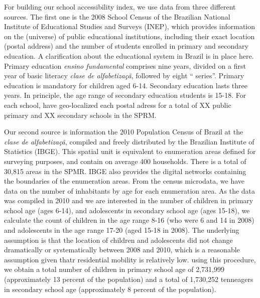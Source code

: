 \documentclass[]{article}
\begin{document}
For building our school accessibility index, we use data from three
different sources. The first one is the 2008 School Census of the
Brazilian National Institute of Educational Studies and Surveys (INEP),
which provides information on the (universe) of public educational
institutions, including their exact location (postal address) and the
number of students enrolled in primary and secondary education. A
clarification about the educational system in Brazil is in place here.
Primary education \textit{ensino fundamental} comprises nine years,
divided on a first year of basic literacy
\textit{clase de alfabetiza\c{c}\~{a}}, followed by eight `` series''.
Primary education is mandatory for children aged 6-14. Secondary
education lasts three years. In principle, the age range of secondary
education students is 15-18. For each school, have geo-localized each
postal adress for a total of XX public primary and XX secondary schools
in the SPRM.

Our second source is information the 2010 Population Census of Brazil at
the \textit{clase de alfabetiza\c{c}\~{a}}, compiled and freely
distributed by the Brazilian Institute of Statistics (IBGE). This
spatial unit is equivalent to enumeration areas defined for surveying
purposes, and contain on average 400 households. There is a total of
30,815 areas in the SPMR. IBGE also provides the digital networks
containing the boundaries of the enumeration areas. From the census
microdata, we have data on the number of inhabitants by age for each
enumeration area. As the data was compiled in 2010 and we are interested
in the number of children in primary school age (ages 6-14), and
adolescents in secondary school age (ages 15-18), we calculate the count
of children in the age range 8-16 (who were 6 and 14 in 2008) and
adolescents in the age range 17-20 (aged 15-18 in 2008). The underlying
assumption is that the location of children and adolescents did not
change dramatically or systematically between 2008 and 2010, which is a
reasonable assumption given thatr residential mobility is relatively
low. using this procedure, we obtain a total number of children in
primary school age of 2,731,999 (approximately 13 percent of the
population) and a total of 1,730,252 tenneagers in secondary school age
(approximately 8 percent of the population).
\end{document}
